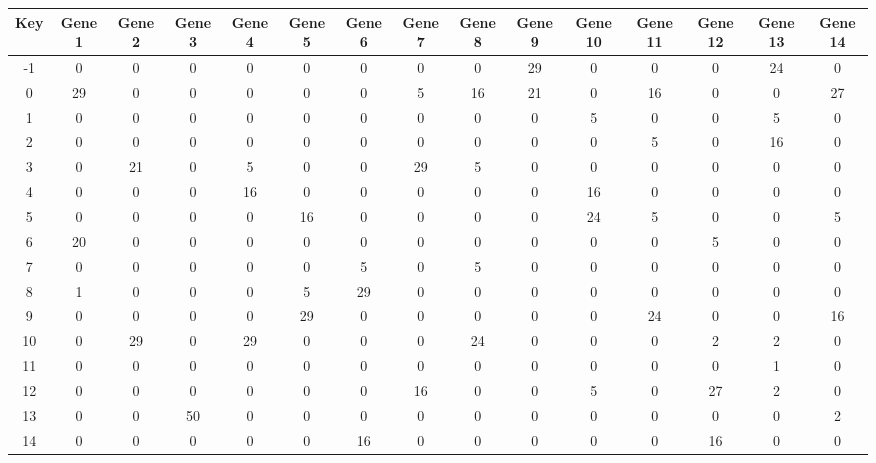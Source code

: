 \begin{tabular}{|c|c|c|c|c|c|c|c|c|c|c|c|c|c|c|}
\hline
Key & Gene 1 & Gene 2 & Gene 3 & Gene 4 & Gene 5 & Gene 6 & Gene 7 & Gene 8 & Gene 9 & Gene 10 & Gene 11 & Gene 12 & Gene 13 & Gene 14 \\
\hline
-1 & 0 & 0 & 0 & 0 & 0 & 0 & 0 & 0 & 29 & 0 & 0 & 0 & 24 & 0 \\
0 & 29 & 0 & 0 & 0 & 0 & 0 & 5 & 16 & 21 & 0 & 16 & 0 & 0 & 27 \\
1 & 0 & 0 & 0 & 0 & 0 & 0 & 0 & 0 & 0 & 5 & 0 & 0 & 5 & 0 \\
2 & 0 & 0 & 0 & 0 & 0 & 0 & 0 & 0 & 0 & 0 & 5 & 0 & 16 & 0 \\
3 & 0 & 21 & 0 & 5 & 0 & 0 & 29 & 5 & 0 & 0 & 0 & 0 & 0 & 0 \\
4 & 0 & 0 & 0 & 16 & 0 & 0 & 0 & 0 & 0 & 16 & 0 & 0 & 0 & 0 \\
5 & 0 & 0 & 0 & 0 & 16 & 0 & 0 & 0 & 0 & 24 & 5 & 0 & 0 & 5 \\
6 & 20 & 0 & 0 & 0 & 0 & 0 & 0 & 0 & 0 & 0 & 0 & 5 & 0 & 0 \\
7 & 0 & 0 & 0 & 0 & 0 & 5 & 0 & 5 & 0 & 0 & 0 & 0 & 0 & 0 \\
8 & 1 & 0 & 0 & 0 & 5 & 29 & 0 & 0 & 0 & 0 & 0 & 0 & 0 & 0 \\
9 & 0 & 0 & 0 & 0 & 29 & 0 & 0 & 0 & 0 & 0 & 24 & 0 & 0 & 16 \\
10 & 0 & 29 & 0 & 29 & 0 & 0 & 0 & 24 & 0 & 0 & 0 & 2 & 2 & 0 \\
11 & 0 & 0 & 0 & 0 & 0 & 0 & 0 & 0 & 0 & 0 & 0 & 0 & 1 & 0 \\
12 & 0 & 0 & 0 & 0 & 0 & 0 & 16 & 0 & 0 & 5 & 0 & 27 & 2 & 0 \\
13 & 0 & 0 & 50 & 0 & 0 & 0 & 0 & 0 & 0 & 0 & 0 & 0 & 0 & 2 \\
14 & 0 & 0 & 0 & 0 & 0 & 16 & 0 & 0 & 0 & 0 & 0 & 16 & 0 & 0 \\
\hline
\end{tabular}